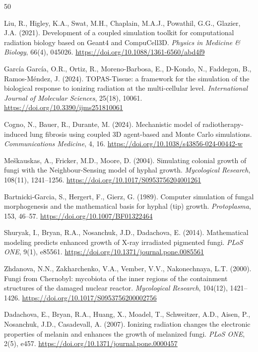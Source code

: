 \documentclass[11pt]{article}
\begin{document}
\begin{thebibliography}{50}

Liu, R., Higley, K.A., Swat, M.H., Chaplain, M.A.J., Powathil, G.G., Glazier, J.A. (2021).
Development of a coupled simulation toolkit for computational radiation biology based on
Geant4 and CompuCell3D.
\textit{Physics in Medicine \& Biology}, 66(4), 045026.
\url{https://doi.org/10.1088/1361-6560/abd4f9}

Garc\'{i}a Garc\'{i}a, O.R., Ortiz, R., Moreno-Barbosa, E., D-Kondo, N., Faddegon, B.,
Ramos-M\'{e}ndez, J. (2024).
TOPAS-Tissue: a framework for the simulation of the biological response to ionizing radiation
at the multi-cellular level.
\textit{International Journal of Molecular Sciences}, 25(18), 10061.
\url{https://doi.org/10.3390/ijms251810061}

Cogno, N., Bauer, R., Durante, M. (2024).
Mechanistic model of radiotherapy-induced lung fibrosis using coupled 3D agent-based and
Monte Carlo simulations.
\textit{Communications Medicine}, 4, 16.
\url{https://doi.org/10.1038/s43856-024-00442-w}

Me\v{s}kauskas, A., Fricker, M.D., Moore, D. (2004).
Simulating colonial growth of fungi with the Neighbour-Sensing model of hyphal growth.
\textit{Mycological Research}, 108(11), 1241--1256.
\url{https://doi.org/10.1017/S0953756204001261}

Bartnicki-Garcia, S., Hergert, F., Gierz, G. (1989).
Computer simulation of fungal morphogenesis and the mathematical basis for hyphal
(tip) growth.
\textit{Protoplasma}, 153, 46--57.
\url{https://doi.org/10.1007/BF01322464}

Shuryak, I., Bryan, R.A., Nosanchuk, J.D., Dadachova, E. (2014).
Mathematical modeling predicts enhanced growth of X-ray irradiated pigmented fungi.
\textit{PLoS ONE}, 9(1), e85561.
\url{https://doi.org/10.1371/journal.pone.0085561}

Zhdanova, N.N., Zakharchenko, V.A., Vember, V.V., Nakonechnaya, L.T. (2000).
Fungi from Chernobyl: mycobiota of the inner regions of the containment structures of the
damaged nuclear reactor.
\textit{Mycological Research}, 104(12), 1421--1426.
\url{https://doi.org/10.1017/S0953756200002756}

Dadachova, E., Bryan, R.A., Huang, X., Moadel, T., Schweitzer, A.D., Aisen, P.,
Nosanchuk, J.D., Casadevall, A. (2007).
Ionizing radiation changes the electronic properties of melanin and enhances the growth of
melanized fungi.
\textit{PLoS ONE}, 2(5), e457.
\url{https://doi.org/10.1371/journal.pone.0000457}


\end{thebibliography}
\end{document}
